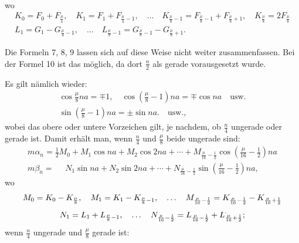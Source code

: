 \begin{landscape}
\[\begin{array}{l}
\end{array}
\]
wo
\[
\begin{gathered}
K_0 = F_0 + F_{\frac{\mu}{4}}, \quad K_1 = F_1 + F_{\frac{\mu}{4}-1}, \quad \ldots \quad K_{\frac{\mu}{8}-1} = F_{\frac{\mu}{8}-1} + F_{\frac{\mu}{8}+1}, \quad K_{\frac{\mu}{8}} = 2F_{\frac{\mu}{8}}\\[4pt]
L_1 = G_1 - G_{\frac{\mu}{4}-1}, \quad \ldots \quad L_{\frac{\mu}{8}-1} = G_{\frac{\mu}{8}-1} - G_{\frac{\mu}{8}+1}.
\end{gathered}
\]
\par\noindent\hspace*{\parindent}Die Formeln 7, 8, 9 lassen sich auf diese Weise nicht weiter zusammenfassen. Bei der Formel 10 ist das möglich, da dort \(\frac{n}{2}\) als gerade vorausgesetzt wurde.
\par\noindent\hspace*{\parindent}Es gilt
nämlich wieder:
\[
\begin{gathered}
\cos\frac{\mu}{8}na = \mp 1, \quad \cos\left(\frac{\mu}{8}-1\right)na = \mp\cos na \quad \text{usw.}\\[4pt]
\sin\left(\frac{\mu}{8}-1\right)na = \pm\sin na\mathord{.}\quad \text{usw.,}
\end{gathered}
\]
wobei das obere oder untere Vorzeichen gilt, je nachdem, ob \(\frac{n}{4}\) ungerade oder gerade ist. Damit
erhält man, wenn \(\frac{n}{4}\)
und \(\frac{\mu}{8}\) beide ungerade sind:
\[
\tag*{11)}
\begin{array}{l}
m\alpha_n = \tfrac{1}{2}M_0 + M_1\cos na + M_2\cos 2na + \cdots + M_{\frac{\mu}{16}-\frac{1}{2}}\cos\left(\frac{\mu}{16}-\frac{1}{2}\right)na \\[4pt]
m\beta_n = \phantom{{}={}} N_1\sin na + N_2\sin 2na + \cdots + N_{\frac{\mu}{16}-\frac{1}{2}}\sin\left(\frac{\mu}{16}-\frac{1}{2}\right)na,
\end{array}
\]
wo
\[
\begin{gathered}
M_0 = K_0 - K_{\frac{\mu}{8}}, \quad M_1 = K_1 - K_{\frac{\mu}{8}-1}, \quad \ldots \quad M_{\frac{\mu}{16}-\frac{1}{2}} = K_{\frac{\mu}{16}-\frac{1}{2}} - K_{\frac{\mu}{16}+\frac{1}{2}}\\[4pt]
N_1 = L_1 + L_{\frac{\mu}{8}-1}, \quad \ldots \quad N_{\frac{\mu}{16}-\frac{1}{2}} = L_{\frac{\mu}{16}-\frac{1}{2}} + \VtwoMarkedL_{\frac{\mu}{16}+\frac{1}{2}};
\end{gathered}
\]
wenn \(\frac{n}{4}\) ungerade und \(\frac{\mu}{8}\) gerade ist:
\[
\tag*{12)}
\begin{array}{l}

\end{array}\]
\end{landscape}
